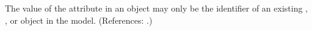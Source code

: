The value of the attribute  in an \EventAssignment object
may only be the identifier of an existing \Compartment, \Species,
\Parameter or \SpeciesReference object in the model.  (References: .)
